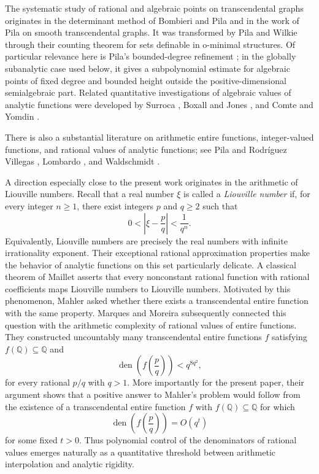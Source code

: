 \documentclass[11pt]{amsart}
\theoremstyle{remark}
\newcommand{\Q}{\mathbb{Q}}
\DeclareMathOperator{\den}{den}
\begin{document}
The systematic study of rational and algebraic points on transcendental graphs originates in the determinant method of Bombieri and Pila \cite{BombieriPila1989} and in the work of Pila \cite{Pila1991} on smooth transcendental graphs. It was transformed by Pila and Wilkie \cite{PilaWilkie2006} through their counting theorem for sets definable in o-minimal structures. Of particular relevance here is Pila's bounded-degree refinement \cite{Pila2009}; in the globally subanalytic case used below, it gives a subpolynomial estimate for algebraic points of fixed degree and bounded height outside the positive-dimensional semialgebraic part. Related quantitative investigations of algebraic values of analytic functions were developed by Surroca \cite{Surroca2002,Surroca2006}, Boxall and Jones \cite{BoxallJones2015a,BoxallJones2015b}, and Comte and Yomdin \cite{ComteYomdin2018}.

There is also a substantial literature on arithmetic entire functions, integer-valued functions, and rational values of analytic functions; see Pila and Rodr\'iguez Villegas \cite{PilaRodriguezVillegas1999}, Lombardo \cite{Lombardo2017}, and Waldschmidt \cite{Waldschmidt2020}.

A direction especially close to the present work originates in the arithmetic of Liouville numbers. Recall that a real number $\xi$ is called a \emph{Liouville number} if, for every integer $n\geq1$, there exist integers $p$ and $q\geq2$ such that
\[
0<\left|\xi-\frac{p}{q}\right|<\frac{1}{q^n}.
\]
Equivalently, Liouville numbers are precisely the real numbers with infinite irrationality exponent. Their exceptional rational approximation properties make the behavior of analytic functions on this set particularly delicate. A classical theorem of Maillet \cite{Maillet1906} asserts that every nonconstant rational function with rational coefficients maps Liouville numbers to Liouville numbers. Motivated by this phenomenon, Mahler \cite{Mahler1984} asked whether there exists a transcendental entire function with the same property. Marques and Moreira \cite{MarquesMoreira2015} subsequently connected this question with the arithmetic complexity of rational values of entire functions. They constructed uncountably many transcendental entire functions $f$ satisfying $f(\Q)\subseteq\Q$ and
\[
\den\!\left(f\!\left(\frac pq\right)\right)<q^{8q^2},
\]
for every rational $p/q$ with $q>1$. More importantly for the present paper, their argument shows that a positive answer to Mahler's problem would follow from the existence of a transcendental entire function $f$ with $f(\Q)\subseteq\Q$ for which
\[
\den\!\left(f\!\left(\frac pq\right)\right)=O(q^t)
\]
for some fixed $t>0$. Thus polynomial control of the denominators of rational values emerges naturally as a quantitative threshold between arithmetic interpolation and analytic rigidity.
\end{document}
